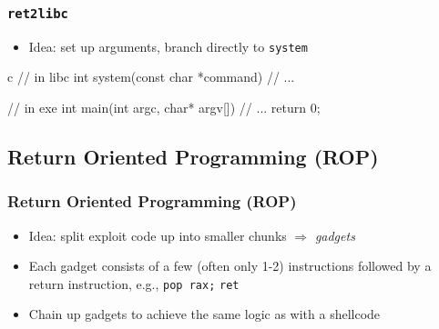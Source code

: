 \documentclass[aspectratio=169]{beamer}
\begin{document}

\begin{frame}[fragile]
    \frametitle{\texttt{ret2libc}}
    \begin{itemize}
        \item Idea: set up arguments, branch directly to \texttt{system}
    \end{itemize}
    \begin{codebox}{c}
// in libc
int system(const char *command) {
    // ...
}

// in exe
int main(int argc, char* argv[]) {
    // ...
    return 0;
}
    \end{codebox}
\end{frame}


\subsection{Return Oriented Programming (ROP)}

\begin{frame}
    \frametitle{Return Oriented Programming (ROP)}
    \begin{itemize}
        \item Idea: split exploit code up into smaller chunks $\Rightarrow$
            \emph{gadgets}
        \item Each gadget consists of a few (often only 1-2) instructions
            followed by a return instruction, e.g., \texttt{pop rax;}
            \texttt{ret}
        \item Chain up gadgets to achieve the same logic as with a shellcode
    \end{itemize}
\end{frame}
\end{document}

